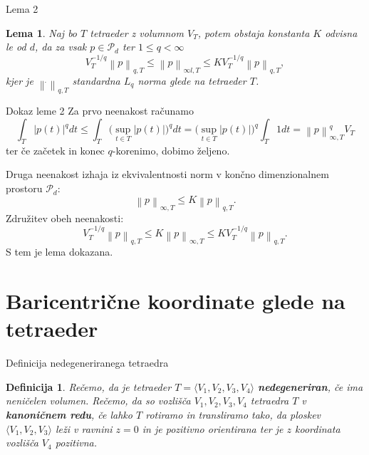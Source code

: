 \documentclass{beamer}
\newtheorem{definition1}{Definicija}
\newtheorem{lemma1}{Lema}
\begin{document}
\begin{frame}{Lema 2}
\begin{lemma1}\label{lema_norma}
    Naj bo $T$ tetraeder z volumnom $V_T$, potem obstaja 
    konstanta $K$ odvisna le od $d$, da za vsak  $p \in \mathcal{P}_d$ ter $1 \le q < \infty$
    \begin{equation}
        V_T^{-1/q} \left\lVert p \right\rVert_{q,T} \le  \left\lVert p \right\rVert_{\infty l, T} \le K V_T^{-1/q} \left\lVert p \right\rVert_{q,T},
    \end{equation}
    kjer je $\left\lVert \dot{} \right\rVert_{q,T}$ standardna $L_q$ norma 
    glede na tetraeder $T$.
\end{lemma1}
\end{frame}


\begin{frame}{Dokaz leme 2}
    Za prvo neenakost računamo
    \begin{equation*}
        \int_{T} |p(t)|^q dt \le 
        \int_{T} \bigg( \sup_{t \in T} |p(t)| \bigg) ^q dt
        = \big(\sup_{t \in T} |p(t)| \big)^q \int_{T}1dt 
        = \left\lVert p \right\rVert_{\infty , T}^{q} V_T
    \end{equation*}
    ter če začetek in konec $q$-korenimo, dobimo željeno.
    
    Druga neenakost izhaja iz ekvivalentnosti norm v končno dimenzionalnem prostoru $\mathcal{P}_d$:
    \[
        \left\lVert p \right\rVert_{\infty, T} \leq K \left\lVert p \right\rVert_{q,T}.
    \]
    Združitev obeh neenakosti:
    \[
        V_T^{-1/q} \left\lVert p \right\rVert_{q,T} \leq K \left\lVert p \right\rVert_{\infty, T} \leq K V_T^{-1/q} \left\lVert p \right\rVert_{q,T}.
    \]
    S tem je lema dokazana.
\end{frame}

\section{Baricentrične koordinate glede na tetraeder}
\begin{frame}{Definicija nedegeneriranega tetraedra}
 \begin{definition1}
    Rečemo, da je tetraeder $T = \langle V_1, V_2, V_3, V_4 \rangle$ \textbf{nedegeneriran}, če ima neničelen volumen. Rečemo, da so vozlišča $V_1 , V_2 , V_3, V_4$ tetraedra $T$ v \textbf{kanoničnem redu}, če lahko $T$ rotiramo in transliramo  tako, da ploskev $\langle V_1, V_2, V_3\rangle$ leži v ravnini $z = 0$ in je pozitivno orientirana ter je $z$ koordinata vozlišča $V_4$ pozitivna.
\end{definition1}
\end{frame}
\end{document}
